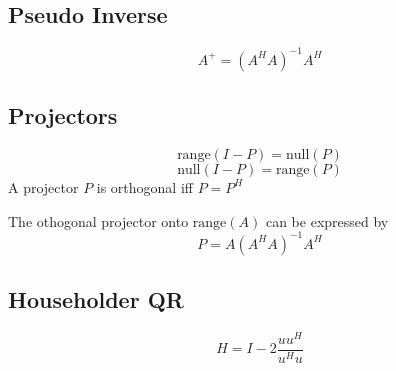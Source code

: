 \documentclass[letterpaper,10pt]{article}
\begin{document}
\begin{multicols}{3}
\subsection*{Pseudo Inverse}
\begin{equation*}
A^{+}=(A^H A)^{-1}A^H
\end{equation*}
\subsection*{Projectors}
\begin{equation*}
\text{range}(I-P)=\text{null}(P)
\end{equation*}
\begin{equation*}
\text{null}(I-P)=\text{range}(P)
\end{equation*}
A projector $P$ is orthogonal iff $P=P^H$

The othogonal projector onto $\text{range}(A)$ can be expressed by
\begin{equation*}
P=A(A^HA)^{-1}A^H
\end{equation*}
\subsection*{Householder QR}
\begin{equation*}
H=I-2\frac{uu^H}{u^Hu}
\end{equation*}
\end{multicols}
\end{document}
